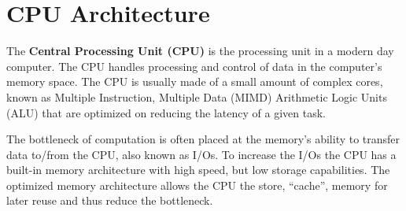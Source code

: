 \section{CPU Architecture}
\label{sec:cpu}
The \textbf{Central Processing Unit (CPU)} is the processing unit in a modern day computer.
The CPU handles processing and control of data in the computer's memory space.
The CPU is usually made of a small amount of complex cores, known as Multiple Instruction, Multiple Data (MIMD) Arithmetic Logic Units (ALU) that are optimized on reducing the latency of a given task.

The bottleneck of computation is often placed at the memory's ability to transfer data to/from the CPU, also known as I/Os.
To increase the I/Os the CPU has a built-in memory architecture with high speed, but low storage capabilities.
The optimized memory architecture allows the CPU the store, ``cache'', memory for later reuse and thus reduce the bottleneck.~\cite{bryant2003computer}
